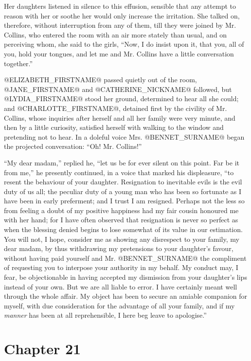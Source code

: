 Her daughters listened in silence to this effusion, sensible that
any attempt to reason with her or soothe her would only increase the
irritation. She talked on, therefore, without interruption from any of
them, till they were joined by Mr. Collins, who entered the room with
an air more stately than usual, and on perceiving whom, she said to
the girls, ``Now, I do insist upon it, that you, all of you, hold
your tongues, and let me and Mr. Collins have a little conversation
together.''

@ELIZABETH_FIRSTNAME@ passed quietly out of the room, @JANE_FIRSTNAME@ and @CATHERINE_NICKNAME@ followed, but
@LYDIA_FIRSTNAME@ stood her ground, determined to hear all she could; and @CHARLOTTE_FIRSTNAME@,
detained first by the civility of Mr. Collins, whose inquiries after
herself and all her family were very minute, and then by a little
curiosity, satisfied herself with walking to the window and pretending
not to hear. In a doleful voice Mrs. @BENNET_SURNAME@ began the projected
conversation: ``Oh! Mr. Collins!''

``My dear madam,'' replied he, ``let us be for ever silent on this point.
Far be it from me,'' he presently continued, in a voice that marked his
displeasure, ``to resent the behaviour of your daughter. Resignation
to inevitable evils is the evil duty of us all; the peculiar duty of a
young man who has been so fortunate as I have been in early preferment;
and I trust I am resigned. Perhaps not the less so from feeling a doubt
of my positive happiness had my fair cousin honoured me with her hand;
for I have often observed that resignation is never so perfect as
when the blessing denied begins to lose somewhat of its value in our
estimation. You will not, I hope, consider me as showing any disrespect
to your family, my dear madam, by thus withdrawing my pretensions to
your daughter's favour, without having paid yourself and Mr. @BENNET_SURNAME@ the
compliment of requesting you to interpose your authority in my
behalf. My conduct may, I fear, be objectionable in having accepted my
dismission from your daughter's lips instead of your own. But we are all
liable to error. I have certainly meant well through the whole affair.
My object has been to secure an amiable companion for myself, with due
consideration for the advantage of all your family, and if my \textit{manner}
has been at all reprehensible, I here beg leave to apologise.''



\chapter*{Chapter 21}


